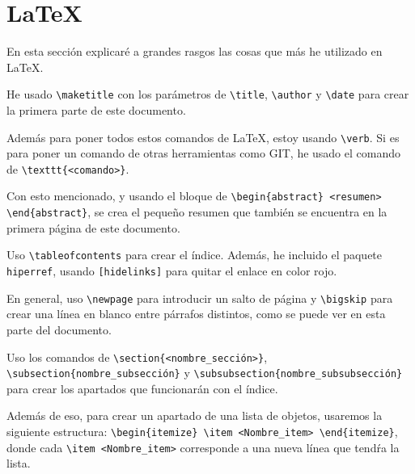 \documentclass[a4,12pt]{article}
\begin{document}
\newpage

\section{\LaTeX}

En esta sección explicaré a grandes rasgos las cosas que más he utilizado en \LaTeX.

\bigskip
He usado \verb+\maketitle+ con los parámetros de \verb+\title+, \verb+\author+ y \verb+\date+ para crear la primera parte de este documento.

\bigskip
Además para poner todos estos comandos de \LaTeX, estoy usando \verb+\verb+. Si es para poner un comando de otras herramientas como GIT, he usado el comando de \verb+\texttt{<comando>}+.

\bigskip
Con esto mencionado, y usando el bloque de \verb+\begin{abstract} <resumen> \end{abstract}+, se crea el pequeño resumen que también se encuentra en la primera página de este documento.

\bigskip
Uso \verb+\tableofcontents+ para crear el índice. Además, he incluido el paquete \texttt{hiperref}, usando \verb+[hidelinks]+ para quitar el enlace en color rojo.

\bigskip
En general, uso \verb+\newpage+ para introducir un salto de página y \verb+\bigskip+ para crear una línea en blanco entre párrafos distintos, como se puede ver en esta parte del documento.

\bigskip
Uso los comandos de \verb+\section{<nombre_sección>}+, \verb+\subsection{nombre_subsección}+ y \verb+\subsubsection{nombre_subsubsección}+ para crear los apartados que funcionarán con el índice.

\bigskip
Además de eso, para crear un apartado de una lista de objetos, usaremos la siguiente estructura:
\verb+\begin{itemize} \item <Nombre_item> \end{itemize}+, donde cada \verb+\item <Nombre_item>+ corresponde a una nueva línea que tendŕa la lista. 
\end{document}
